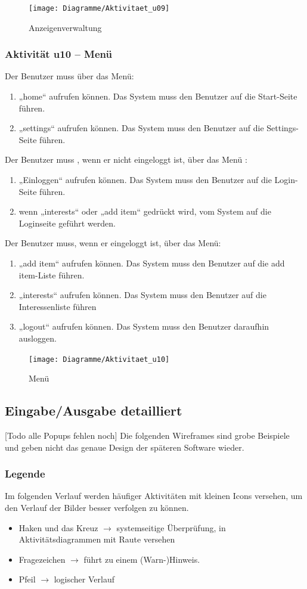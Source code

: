 \documentclass[a4paper,12pt,oneside]{scrartcl}
\begin{document}
\begin{figure}[!htbp]
\centering
\noindent\texttt{[image: Diagramme/Aktivitaet\_u09]}
\caption{Anzeigenverwaltung}
\end{figure}
\FloatBarrier

\subsubsection{Aktivität u10 – Menü}
Der Benutzer muss über das Menü:
\begin{enumerate}
	\item „home“ aufrufen können. Das System muss den Benutzer auf die Start-Seite führen.
	\item „settings“ aufrufen können. Das System muss den Benutzer auf die Settings-Seite führen.
\end{enumerate}
Der Benutzer muss , wenn er nicht eingeloggt ist, über das Menü :
\begin{enumerate}
	\item „Einloggen“ aufrufen können. Das System muss den Benutzer auf die Login-Seite führen.
	\item wenn „interests“ oder „add item“ gedrückt wird, vom System auf die Loginseite geführt werden.
\end{enumerate}
Der Benutzer muss, wenn er eingeloggt ist, über das Menü:
\begin{enumerate}
	\item „add item“ aufrufen können. Das System muss den Benutzer auf die add item-Liste führen.
	\item „interests“ aufrufen können. Das System muss den Benutzer auf die Interessenliste führen
	\item „logout“ aufrufen können. Das System muss den Benutzer daraufhin ausloggen. 
\end{enumerate}

\begin{figure}[!htbp]
\centering
\noindent\texttt{[image: Diagramme/Aktivitaet\_u10]}
\caption{Menü}
\end{figure}
\FloatBarrier


\subsection{Eingabe/Ausgabe detailliert}
[Todo alle Popups fehlen noch]
Die folgenden Wireframes sind grobe Beispiele und geben nicht das genaue Design der späteren Software wieder.

\subsubsection*{Legende}
Im folgenden Verlauf werden häufiger Aktivitäten mit kleinen Icons versehen, um den Verlauf der Bilder besser verfolgen zu können.
\begin{itemize}
	\item Haken und das Kreuz $\rightarrow$  systemseitige Überprüfung, in Aktivitätsdiagrammen mit Raute versehen
	\item Fragezeichen $\rightarrow$ führt zu einem (Warn-)Hinweis.
	\item Pfeil $\rightarrow$ logischer Verlauf
\end{itemize}
\end{document}
